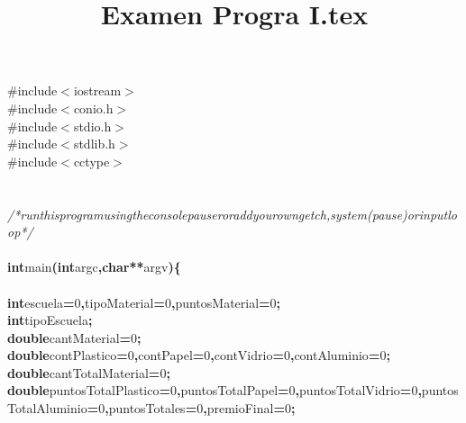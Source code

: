 \documentclass[a4paper, 10pt]{article}
\title{Examen Progra I.tex}
\newcommand\SPC{\hspace*{0.6em}}
\newcommand\TAB{\hspace*{1.2em}}
\newcommand\QOT{\mbox{\char 34}}
\newcommand{\CppAComment}[1]{\textit{\textcolor[rgb]{0,0.47,0.84}{#1}}}
\newcommand{\CppAIdentifier}[1]{#1}
\newcommand{\CppANumber}[1]{\textcolor[rgb]{0.5,0,0.5}{#1}}
\newcommand{\CppAPreprocessor}[1]{\textcolor[rgb]{0,0.5,0}{#1}}
\newcommand{\CppAReservedWord}[1]{\textbf{#1}}
\newcommand{\CppASpace}[1]{\colorbox[rgb]{1,1,1}{#1}}
\newcommand{\CppASymbol}[1]{\textbf{\textcolor[rgb]{1,0,0}{#1}}}
\begin{document}
\begin{ttfamily}
\noindent
\CppAPreprocessor{\#include\SPC $<$iostream$>$}\\
\CppAPreprocessor{\#include\SPC $<$conio.h$>$}\\
\CppAPreprocessor{\#include\SPC $<$stdio.h$>$}\\
\CppAPreprocessor{\#include\SPC $<$stdlib.h$>$}\\
\CppAPreprocessor{\#include\SPC $<$cctype$>$}\\
\\
\\
\CppAComment{/*\SPC run\SPC this\SPC program\SPC using\SPC the\SPC console\SPC pauser\SPC or\SPC add\SPC your\SPC own\SPC getch,\SPC system(\QOT pause\QOT )\SPC or\SPC input\SPC loop\SPC */}\\
\\
\CppAReservedWord{int}\CppASpace{\SPC }\CppAIdentifier{main}\CppASymbol{(}\CppAReservedWord{int}\CppASpace{\SPC }\CppAIdentifier{argc}\CppASymbol{,}\CppASpace{\SPC }\CppAReservedWord{char}\CppASymbol{*}\CppASymbol{*}\CppASpace{\SPC }\CppAIdentifier{argv}\CppASymbol{)}\CppASpace{\SPC }\CppASymbol{\{}\\
\CppASpace{\TAB }\\
\CppASpace{\TAB }\CppAReservedWord{int}\CppASpace{\SPC }\CppAIdentifier{escuela}\CppASymbol{=}\CppANumber{0}\CppASymbol{,}\CppASpace{\SPC }\CppAIdentifier{tipoMaterial}\CppASymbol{=}\CppANumber{0}\CppASymbol{,}\CppAIdentifier{puntosMaterial}\CppASymbol{=}\CppANumber{0}\CppASymbol{;}\\
\CppASpace{\TAB }\CppAReservedWord{int}\CppASpace{\SPC }\CppAIdentifier{tipoEscuela}\CppASymbol{;}\\
\CppASpace{\TAB }\CppAReservedWord{double}\CppASpace{\SPC }\CppAIdentifier{cantMaterial}\CppASymbol{=}\CppANumber{0}\CppASymbol{;}\\
\CppASpace{\TAB }\CppAReservedWord{double}\CppASpace{\SPC }\CppAIdentifier{contPlastico}\CppASymbol{=}\CppANumber{0}\CppASymbol{,}\CppAIdentifier{contPapel}\CppASymbol{=}\CppANumber{0}\CppASymbol{,}\CppASpace{\SPC }\CppAIdentifier{contVidrio}\CppASymbol{=}\CppANumber{0}\CppASymbol{,}\CppAIdentifier{contAluminio}\CppASymbol{=}\CppANumber{0}\CppASymbol{;}\\
\CppASpace{\TAB }\CppAReservedWord{double}\CppASpace{\SPC }\CppAIdentifier{cantTotalMaterial}\CppASymbol{=}\CppANumber{0}\CppASymbol{;}\\
\CppASpace{\TAB }\CppAReservedWord{double}\CppASpace{\SPC }\CppAIdentifier{puntosTotalPlastico}\CppASymbol{=}\CppANumber{0}\CppASymbol{,}\CppAIdentifier{puntosTotalPapel}\CppASymbol{=}\CppANumber{0}\CppASymbol{,}\CppAIdentifier{puntosTotalVidrio}\CppASymbol{=}\CppANumber{0}\CppASymbol{,}\CppAIdentifier{puntosTotalAluminio}\CppASymbol{=}\CppANumber{0}\CppASymbol{,}\CppASpace{\SPC }\CppAIdentifier{puntosTotales}\CppASymbol{=}\CppANumber{0}\CppASymbol{,}\CppASpace{\SPC }\CppAIdentifier{premioFinal}\CppASymbol{=}\CppANumber{0}\CppASymbol{;}\\

\end{ttfamily}
\end{document}
